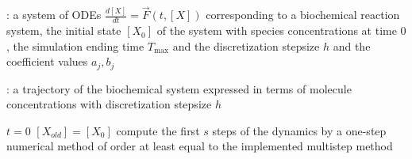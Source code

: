 \begin{algorithm}[H]
\DontPrintSemicolon
{}

\caption{\protect\TitleFunction{}}
\label{algo:s1-method}

\Input: a system of ODEs $\frac{d[X]}{dt} = \vec{F}(t, [X])$ corresponding to a biochemical reaction system, the initial state $[X_0]$ of the system with species concentrations at time $0$, the simulation ending time $T_{\max}$ and the discretization stepsize $h$ and the coefficient values $a_j, b_j$\;

\Output: a trajectory of the biochemical system expressed in terms of molecule concentrations with discretization stepsize $h$\;

$t = 0$\;
$[X_{old}] = [X_0]$\;
compute the first $s$ steps of the dynamics by a one-step numerical method of order at least equal to the implemented multistep method\;

\end{algorithm}
